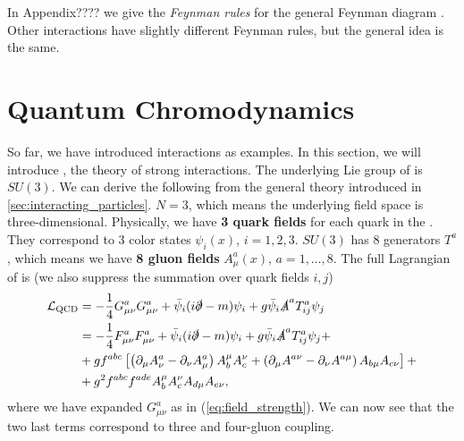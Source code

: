 In Appendix???? we give the \emph{Feynman rules} for the general \QED Feynman diagram \cite{intro_to_part}.
Other interactions have slightly different Feynman rules, but the general idea is the same.


\section{Quantum Chromodynamics}
\label{sec:QCD}
So far, we have introduced \QED interactions as examples. 
In this section, we will introduce \QCD, the theory of strong interactions.
The underlying Lie group of \QCD is  $SU(3)$.
We can derive the following from the general theory introduced in \cref{sec:interacting_particles}. 
$N=3$, which means the underlying field space is three-dimensional.
Physically, we have \textbf{3 quark fields} for each quark in the \SM.
They correspond to 3 color states $\psi_i(x)$, $i=1,2,3$.
$SU(3)$ has 8 generators $T^a$, which means we have \textbf{8 gluon fields} $A^a_\mu(x)$, $a=1,\dots, 8$.
The full Lagrangian of \QCD is \cite{qcd} (we also suppress the summation over quark fields $i,j$)
\begin{align}
\begin{split}
    \label{eq:qcd_lag}
    \mathcal{L}_{\text{QCD}}  &= - \frac{1}{4}  G^a_{\mu\nu} G^a_{\mu\nu}  + \bar{\psi}_i (i \slashed{\partial} - m ) \psi_i + g \bar{\psi}_i \slashed{A}^a T^a_{ij} \psi_j \\
     &= - \frac{1}{4}  F^a_{\mu\nu} F^a_{\mu\nu}  + \bar{\psi}_i (i \slashed{\partial} - m ) \psi_i + g \bar{\psi}_i \slashed{A}^a T^a_{ij} \psi_j + \\    
     &+ g f^{a b c}\left[\left(\partial_\mu A_\nu^a-\partial_\nu A_\mu^a\right) A_b^\mu A_c^\nu+\left(\partial_\mu A^{a\nu}-\partial_\nu A^{a \mu}\right) A_{b \mu} A_{c \nu}\right] + \\
     &+ g^2 f^{a b c} f^{a d e} A_b^\mu A_c^\nu A_{d \mu} A_{e \nu},
\end{split}
\end{align}
where we have expanded $G^a_{\mu\nu}$ as in (\ref{eq:field_strength}). 
We can now see that the two last terms correspond to three and four-gluon coupling.

